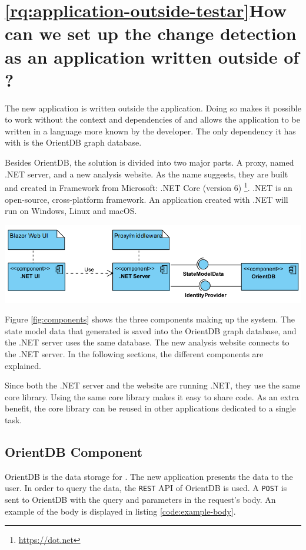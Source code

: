 
\section{\ref{rq:application-outside-testar}How can we set up the change detection as an application written outside of \testar?} \label{sec:components-explained}
The new application is written outside the \testar application. Doing so makes it possible to work without the context and dependencies of \testar and allows the application to be written in a language more known by the developer. The only dependency it has with \testar is the OrientDB graph database.

Besides OrientDB, the solution is divided into two major parts. A \testar proxy, named .NET server, and a new \testar analysis website. As the name suggests, they are built and created in Framework from Microsoft: .NET Core (version 6) \footnote{\url{https://dot.net}}. .NET is an open-source, cross-platform framework. An application created with .NET will run on Windows, Linux and macOS. 

\begingroup
\captionsetup{type=figure}
\includegraphics[scale=0.7]{thesis/images/server-ui-comp.png}
\label{fig:components}
\endgroup

Figure \ref{fig:components} shows the three components making up the system. The state model data that \testar generated is saved into the OrientDB graph database, and the .NET server uses the same database. The new \testar analysis website connects to the .NET server. In the following sections, the different components are explained. 

Since both the .NET server and the website are running .NET, they use the same core library. Using the same core library makes it easy to share code. As an extra benefit, the core library can be reused in other applications dedicated to a single task. 

\subsection{OrientDB Component}
OrientDB is the data storage for \testar. The new application presents the data to the user. In order to query the data, the \verb|REST| API of OrientDB is used. A \verb|POST| is sent to OrientDB with the query and parameters in the request's body. An example of the body is displayed in listing \ref{code:example-body}.

